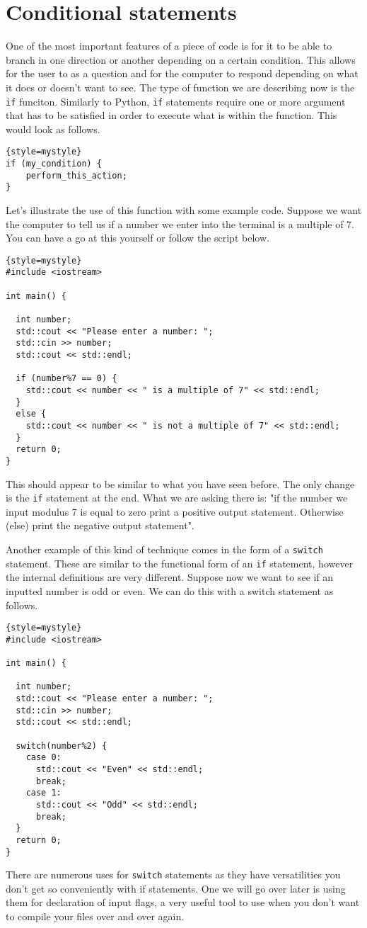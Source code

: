 \section{Conditional statements}
One of the most important features of a piece of code is for it to be able to branch in one direction or another depending on a certain condition.
This allows for the user to as a question and for the computer to respond depending on what it does or doesn't want to see.
The type of function we are describing now is the \texttt{if} funciton.
Similarly to Python, \texttt{if} statements require one or more argument that has to be satisfied in order to execute what is within the function.
This would look as follows.
\begin{lstlisting}{style=mystyle}
if (my_condition) {
	perform_this_action;
}
\end{lstlisting}
Let's illustrate the use of this function with some example code.
Suppose we want the computer to tell us if a number we enter into the terminal is a multiple of 7.
You can have a go at this yourself or follow the script below.
\begin{lstlisting}{style=mystyle}
#include <iostream>

int main() {
  
  int number;
  std::cout << "Please enter a number: ";
  std::cin >> number;
  std::cout << std::endl;
  
  if (number%7 == 0) {
    std::cout << number << " is a multiple of 7" << std::endl;
  }
  else {
    std::cout << number << " is not a multiple of 7" << std::endl;
  }
  return 0;
}
\end{lstlisting}
This should appear to be similar to what you have seen before.
The only change is the \texttt{if} statement at the end.
What we are asking there is: "if the number we input modulus 7 is equal to zero print a positive output statement. Otherwise (else) print the negative output statement".

Another example of this kind of technique comes in the form of a \texttt{switch} statement.
These are similar to the functional form of an \texttt{if} statement, however the internal definitions are very different.
Suppose now we want to see if an inputted number is odd or even.
We can do this with a switch statement as follows.
\begin{lstlisting}{style=mystyle}
#include <iostream>

int main() {
  
  int number;
  std::cout << "Please enter a number: ";
  std::cin >> number;
  std::cout << std::endl;
  
  switch(number%2) {
    case 0:
      std::cout << "Even" << std::endl;
      break;
    case 1:
      std::cout << "Odd" << std::endl;
      break;
  }
  return 0;
}
\end{lstlisting}
There are numerous uses for \texttt{switch} statements as they have versatilities you don't get so conveniently with if statements. 
One we will go over later is using them for declaration of input flags, a very useful tool to use when you don't want to compile your files over and over again.

